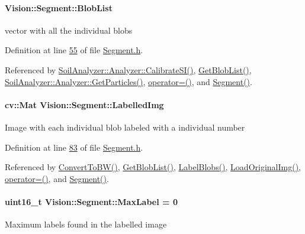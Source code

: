 \paragraph[{Blob\+List}]{ Vision\+::\+Segment\+::\+Blob\+List}\label{class_vision_1_1_segment_a74e0600a7dd49bd7110ee27bb4cd6e0e}
vector with all the individual blobs 

Definition at line \hyperlink{_segment_8h_source_l00055}{55} of file \hyperlink{_segment_8h_source}{Segment.\+h}.



Referenced by \hyperlink{analyzer_8cpp_source_l00388}{Soil\+Analyzer\+::\+Analyzer\+::\+Calibrate\+S\+I()}, \hyperlink{_segment_8cpp_source_l00534}{Get\+Blob\+List()}, \hyperlink{analyzer_8cpp_source_l00303}{Soil\+Analyzer\+::\+Analyzer\+::\+Get\+Particles()}, \hyperlink{_segment_8cpp_source_l00041}{operator=()}, and \hyperlink{_segment_8cpp_source_l00026}{Segment()}.

\hypertarget{class_vision_1_1_segment_a4daa143f6cd4a753d3bbe45c6a67d27f}{}
\paragraph[{Labelled\+Img}]{\setlength{\rightskip}{0pt plus 5cm}cv\+::\+Mat Vision\+::\+Segment\+::\+Labelled\+Img}\label{class_vision_1_1_segment_a4daa143f6cd4a753d3bbe45c6a67d27f}
Image with each individual blob labeled with a individual number 

Definition at line \hyperlink{_segment_8h_source_l00083}{83} of file \hyperlink{_segment_8h_source}{Segment.\+h}.



Referenced by \hyperlink{_segment_8cpp_source_l00153}{Convert\+To\+B\+W()}, \hyperlink{_segment_8cpp_source_l00534}{Get\+Blob\+List()}, \hyperlink{_segment_8cpp_source_l00316}{Label\+Blobs()}, \hyperlink{_segment_8cpp_source_l00056}{Load\+Original\+Img()}, \hyperlink{_segment_8cpp_source_l00041}{operator=()}, and \hyperlink{_segment_8cpp_source_l00020}{Segment()}.

\hypertarget{class_vision_1_1_segment_a22d2a688de65f4d25b164f8b2a03f4a9}{}
\paragraph[{Max\+Label}]{\setlength{\rightskip}{0pt plus 5cm}uint16\+\_\+t Vision\+::\+Segment\+::\+Max\+Label = 0}\label{class_vision_1_1_segment_a22d2a688de65f4d25b164f8b2a03f4a9}
Maximum labels found in the labelled image 

